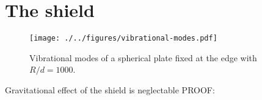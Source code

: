\chapter{The shield}\label{cha:the-shield}

\begin{figure}[!htbp]
  \centering
  \texttt{[image: ./../figures/vibrational-modes.pdf]}
  \label{fig:vibrational-modes}
  \caption{Vibrational modes of a spherical plate fixed at the edge with $R/d = 1000$.}
\end{figure}



Gravitational effect of the shield is neglectable
PROOF: